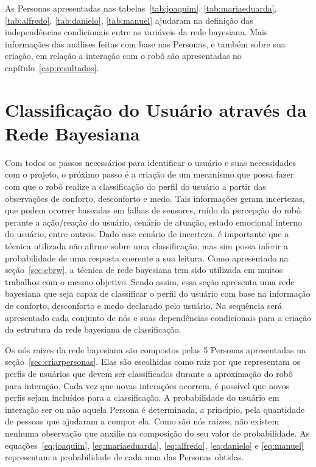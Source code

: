 As Personas apresentadas nas tabelas~\ref{tab:joaquim}, \ref{tab:mariaeduarda}, \ref{tab:alfredo}, \ref{tab:danielo}, \ref{tab:manuel} ajudaram na definição das independências condicionais entre as variáveis da rede bayesiana. Mais informações das análises feitas com base nas Personas, e também sobre sua criação, em relação a interação com o robô são apresentadas no capítulo~\ref{cap:resultados}.

\section{Classificação do Usuário através da Rede Bayesiana}
\label{sec:rede-bayesiana}

Com todos os passos necessários para identificar o usuário e suas necessidades com o projeto, o próximo passo é a criação de um mecanismo que possa fazer com que o robô realize a classificação do perfil do usuário a partir das observações de conforto, desconforto e medo. Tais informações geram incertezas, que podem ocorrer baseadas em falhas de sensores, ruído da percepção do robô perante a ação/reação do usuário, cenário de atuação, estado emocional interno do usuário, entre outros. Dado esse cenário de incerteza, é importante que a técnica utilizada não afirme sobre uma classificação, mas sim possa inferir a probabilidade de uma resposta coerente a sua leitura. Como apresentado na seção~\ref{sec:cbrw}, a técnica de rede bayesiana tem sido utilizada em muitos trabalhos com o mesmo objetivo. Sendo assim, essa seção apresenta uma rede bayesiana que seja capaz de classificar o perfil do usuário com base na informação de conforto, desconforto e medo declarado pelo usuário. Na sequência será apresentado cada conjunto de nós e suas dependências condicionais para a criação da estrutura da rede bayesiana de classificação.

Os nós raizes da rede bayesiana são compostos pelas 5 Personas apresentadas na seção~\ref{sec:criarpersonas}. Elas são escolhidas como raiz por que representam os perfis de usuários que devem ser classificados durante a aproximação do robô para interação. Cada vez que novas interações ocorrem, é possível que novos perfis sejam incluídos para a classificação. A probabilidade do usuário em interação ser ou não aquela Persona é determinada, a princípio, pela quantidade de pessoas que ajudaram a compor ela. Como são nós raizes, não existem nenhuma observação que auxilie na composição do seu valor de probabilidade. As equações~\ref{eq:joaquim}, \ref{eq:mariaeduarda}, \ref{eq:alfredo}, \ref{eq:danielo} e \ref{eq:manuel} representam a probabilidade de cada uma das Personas obtidas.

